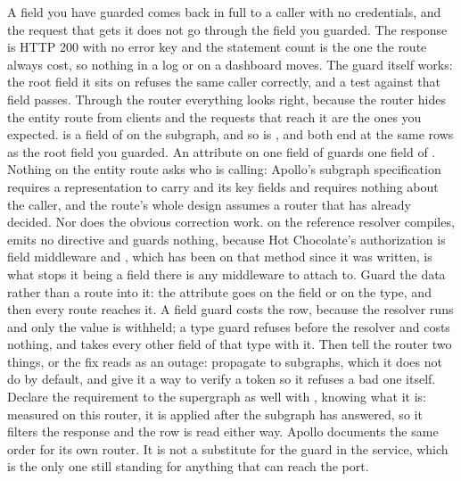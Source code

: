 \begin{problemsummary}
{A field you have guarded comes back in full to a caller with no credentials,
and the request that gets it does not go through the field you guarded. The
response is HTTP 200 with no error key and the statement count is the one the
route always cost, so nothing in a log or on a dashboard moves. The guard
itself works: the root field it sits on refuses the same caller correctly, and
a test against that field passes. Through the router everything looks right,
because the router hides the entity route from clients and the requests that
reach it are the ones you expected.}
{ is a field of  on the subgraph, and so is
, and both end at the same rows as the root field you
guarded. An attribute on one field of  guards one field of
. Nothing on the entity route asks who is calling: Apollo's
subgraph specification requires a representation to carry
 and its key fields and requires nothing about the caller,
and the route's whole design assumes a router that has already decided. Nor
does the obvious correction work. \code{[Authorize]} on the reference
resolver compiles, emits no directive and guards nothing, because Hot
Chocolate's authorization is field middleware and \code{[GraphQLIgnore]},
which has been on that method since it was written, is what stops it being a
field there is any middleware to attach to.}
{Guard the data rather than a route into it: the attribute goes on the field
or on the type, and then every route reaches it. A field guard costs the row,
because the resolver runs and only the value is withheld; a type guard
refuses before the resolver and costs nothing, and takes every other field of
that type with it. Then tell the router two things, or the fix reads as an
outage: propagate  to subgraphs, which it does not do by
default, and give it a way to verify a token so it refuses a bad one itself.
Declare the requirement to the supergraph as well with ,
knowing what it is: measured on this router, it is applied after the subgraph
has answered, so it filters the response and the row is read either way.
Apollo documents the same order for its own router. It is not a substitute for
the guard in the service, which is the only one still standing for anything
that can reach the port.}
\end{problemsummary}
